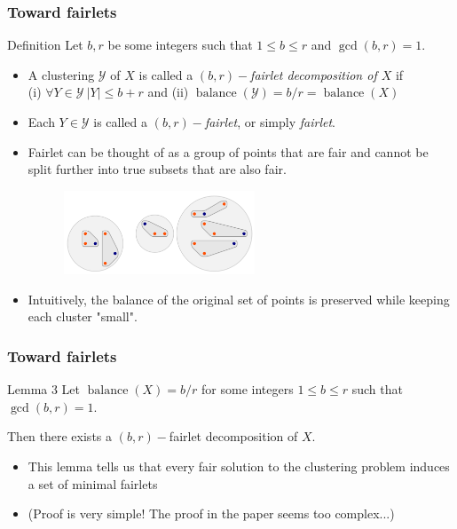 \documentclass{beamer}
\DeclareMathOperator{\balance}{balance}
\begin{document}


\begin{frame}
\frametitle{Toward fairlets }

\begin{alertblock}{Definition}
Let $b, r$ be some integers such that $1 \leq b \leq r$ and $\gcd(b, r) = 1$.

\begin{itemize}
	\item A clustering $\mathcal{Y}$ of $X$ is called a {\it $(b, r)-$fairlet decomposition of $X$} if\\
	(i) $\forall Y \in \mathcal{Y} \ |Y| \leq b + r$ and (ii) $\balance(\mathcal{Y}) = b/r = \balance(X)$
	\item Each $Y \in \mathcal{Y}$ is called a {\it $(b, r)-$fairlet}, or simply {\it fairlet}.
\end{itemize}

\end{alertblock} \pause

\begin{itemize}
	\item Fairlet can be thought of as a group of points that are fair and cannot be split further into true subsets that are also fair.
		\begin{figure}[hbt]
  			\includegraphics[height=2.5cm]{fig2.png}
		\end{figure} \pause
	\item Intuitively, the balance of the original set of points is preserved while keeping each cluster "small".
\end{itemize}

\end{frame}


\begin{frame}
\frametitle{Toward fairlets}

\begin{block}{Lemma 3}
Let $\balance(X) = b/r$ for some integers $1 \leq b \leq r$ such that $\gcd(b, r) = 1$.

Then there exists a $(b, r)-$fairlet decomposition of $X$.
\end{block} \pause

\begin{itemize}
	\item This lemma tells us that every fair solution to the clustering problem induces a set of minimal fairlets
	\item (Proof is very simple! The proof in the paper seems too complex...)
\end{itemize}

\end{frame}
\end{document}

